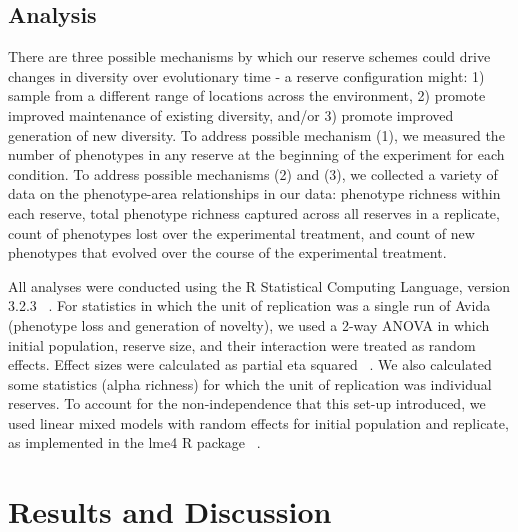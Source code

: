 \documentclass[letterpaper]{article}
\begin{document}
\subsection{Analysis}
    
	There are three possible mechanisms by which our reserve schemes could drive changes in diversity over evolutionary time - a reserve configuration might: 1) sample from a different range of locations across the environment, 2) promote improved maintenance of existing diversity, and/or 3)  promote improved generation of new diversity. To address possible mechanism (1), we measured the number of phenotypes in any reserve at the beginning of the experiment for each condition. To address possible mechanisms (2) and (3), we collected a variety of data on the phenotype-area relationships in our data: phenotype richness within each reserve, total phenotype richness captured across all reserves in a replicate, count of phenotypes lost over the experimental treatment, and count of new phenotypes that evolved over the course of the experimental treatment.
    
	All analyses were conducted using the R Statistical Computing Language, version 3.2.3 ~\citep{team_r:_2013}. For statistics in which the unit of replication was a single run of Avida (phenotype loss and generation of novelty), we used a 2-way ANOVA in which initial population, reserve size, and their interaction were treated as random effects. Effect sizes were calculated as partial eta squared ~\citep{lakens_calculating_2013}. We also calculated some statistics (alpha richness) for which the unit of replication was individual reserves. To account for the non-independence that this set-up introduced, we used linear mixed models with random effects for initial population and replicate, as implemented in the lme4 R package ~\citep{bates_fitting_2015}.

\section{Results and Discussion}
\end{document}

